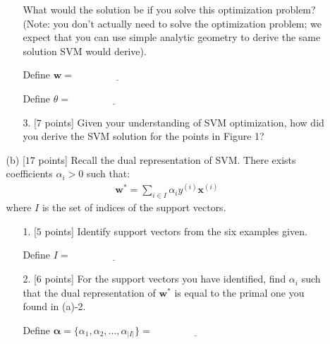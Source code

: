 \begin{enumerate}
\begin{enumerate}
\begin{enumerate}
What would the solution be if you solve this optimization problem? (Note: you don't actually need to solve the optimization problem; we expect that you can use simple analytic geometry to derive the same solution SVM would derive).

\vspace{.13in}
Define $\mathbf{w}=$ $\underline{\qquad\qquad\qquad\qquad}$

\vspace{.13in}
Define $\theta =$ $\underline{\qquad\qquad\qquad\qquad}$
\vspace{.13in}

\item[3.][$7$ points] Given your understanding of SVM optimization, how did you derive the SVM solution for the points in Figure 1?

\vspace{.60in}

\end{enumerate}

\item[(b)][$17$ points]
Recall the dual representation of SVM. There exists coefficients $\alpha_{i} > 0$ such that:
\begin{eqnarray}
\mathbf{w}^{*} = \sum_{i\in I}{\alpha_{i}y^{(i)}\mathbf{x}^{(i)}}
\end{eqnarray}
where $I$ is the set of indices of the support vectors.
\begin{enumerate}

\item[1.][$5$ points] Identify support vectors from the six examples given.

\vspace{.2in}
Define $I =$ $\underline{\qquad\qquad\qquad\qquad}$
\vspace{.2in}


\item[2.][$6$ points] For the support vectors you have identified, find $\alpha_i$ such that the dual representation of $\mathbf{w}^{*}$ is equal to the primal one you found in (a)-2.

 \vspace{.2in}
Define $\mathbf{\alpha} = \{\alpha_1, \alpha_2, ..., \alpha_{|I|}\} = $ $\underline{\qquad\qquad\qquad\qquad}$
\vspace{.2in}



\end{enumerate}
\end{enumerate}
\end{enumerate}
